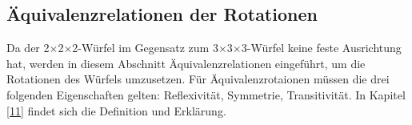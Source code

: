 \documentclass[12pt,a4paper, usenames, dvipsnames]{article}
\newcommand{\Ttwo}{2$\times$2$\times$2-}
\newcommand{\Tthree}{3$\times$3$\times$3-}
\begin{document}







%
%
%
%
%
%
%
%
%
%
%
%
%
%
%
%
%
%
%
%
\color{black}

\subsection*{Äquivalenzrelationen der Rotationen}

Da der \Ttwo Würfel im Gegensatz zum \Tthree Würfel keine feste Ausrichtung hat, werden in diesem Abschnitt Äquivalenzrelationen eingeführt, um die Rotationen des Würfels umzusetzen.
Für Äquivalenzrotaionen müssen die drei folgenden Eigenschaften gelten: Reflexivität, Symmetrie, Transitivität. In Kapitel \ref{11} findet sich die Definition und Erklärung.
\end{document}
